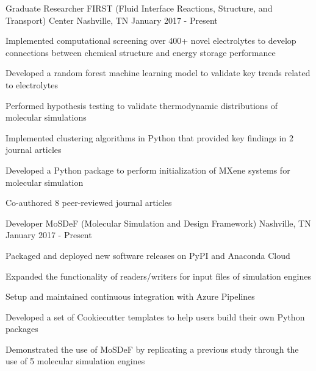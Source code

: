 
\begin{cventries}
  \cventry
    {Graduate Researcher} %
    {FIRST (Fluid Interface Reactions, Structure, and Transport) Center} %
    {Nashville, TN} %
    {January 2017 - Present} %
    {
      \begin{cvitems} %
        \item{Implemented computational screening over 400+ novel electrolytes to
        develop \newline
        connections between chemical structure and energy storage performance}
        \item {Developed a random forest machine learning model to validate key trends related to
            electrolytes}
        \item{Performed hypothesis testing to validate thermodynamic
            distributions of molecular simulations}
        \item {Implemented clustering algorithms in Python that
            provided key findings in 2 journal articles}
        \item {Developed a Python package to perform initialization of 
            MXene systems for molecular simulation}
        \item {Co-authored 8 peer-reviewed journal articles}
      \end{cvitems}
    }

  \cventry
    {Developer} %
    {MoSDeF (Molecular Simulation and Design Framework)} %
    {Nashville, TN} %
    {January 2017 - Present} %
    {
      \begin{cvitems} %
      \item {Packaged and deployed new software releases on PyPI and Anaconda
          Cloud}
        \item {Expanded the functionality of readers/writers for input files of
            simulation engines}
        \item{Setup and maintained continuous integration with Azure Pipelines}
        \item{Developed a set of Cookiecutter templates to help users build 
            their own Python packages}
        \item{Demonstrated the use of MoSDeF by replicating a previous study
            through the use of 5 molecular simulation engines}
      \end{cvitems}
    }
\end{cventries}
